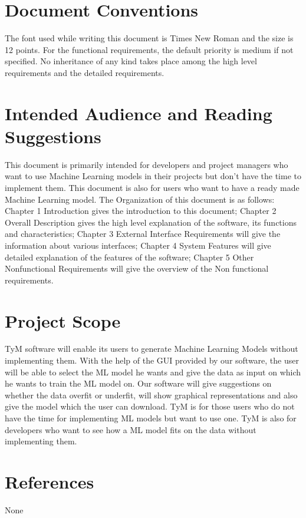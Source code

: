 \documentclass[12pt]{scrreprt}
\begin{document}
\section{Document Conventions}
The font used while writing this document is Times New Roman and the size is 12 points. For the functional requirements, the default priority is medium if not specified. No inheritance of any kind takes place among the high level requirements and the detailed requirements.

\section{Intended Audience and Reading Suggestions}
This document is primarily intended for developers and project managers who want to use Machine Learning models in their projects but don't have the time to implement them. This document is also for users who want to have a ready made Machine Learning model. The Organization of this document is as follows: Chapter 1 Introduction gives the introduction to this document; Chapter 2 Overall Description gives the high level explanation of the software, its functions and characteristics; Chapter 3 External Interface Requirements will give the information about various interfaces; Chapter 4 System Features will give detailed explanation of the features of the software; Chapter 5 Other Nonfunctional Requirements will give the overview of the Non functional requirements.

\section{Project Scope}
TyM software will enable its users to generate Machine Learning Models without implementing them. With the help of the GUI provided by our software, the user will be able to select the ML model he wants and give the data as input on which he wants to train the ML model on. Our software will give suggestions on whether the data overfit or underfit, will show graphical representations and also give the model which the user can download. TyM is for those users who do not have the time for implementing ML models but want to use one. TyM is also for developers who want to see how a ML model fits on the data without implementing them.

\section{References}
None
\end{document}
